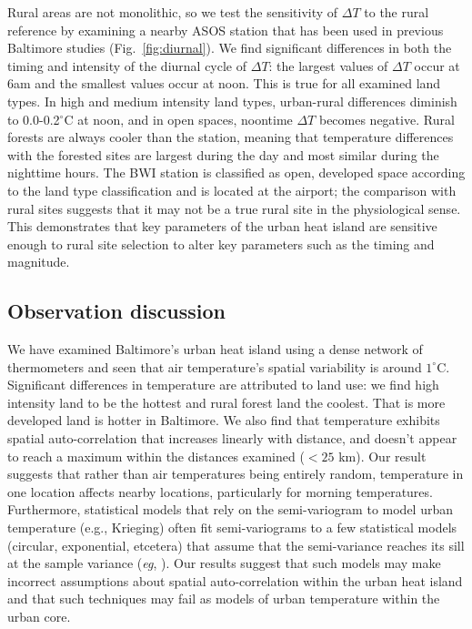 \documentclass[draft,linenumbers]{agujournal}
\begin{document}
Rural areas are not monolithic, so we test the sensitivity of $\Delta T$ to the rural reference by examining a nearby ASOS station that has been used in previous Baltimore studies \citep{li2013synergistic} (Fig.~\ref{fig:diurnal}). We find significant differences in both the timing and intensity of the diurnal cycle of $\Delta T$: the largest values of $\Delta T$ occur at 6am and the smallest values occur at noon. This is true for all examined land types. In high and medium intensity land types, urban-rural differences diminish to 0.0-0.2$^\circ$C at noon, and in open spaces, noontime $\Delta T$ becomes negative. Rural forests are always cooler than the station, meaning that temperature differences with the forested sites are largest during the day and most similar during the nighttime hours. The BWI station is classified as open, developed space according to the land type classification and is located at the airport; the comparison with rural sites suggests that it may not be a true rural site in the physiological sense. This demonstrates that key parameters of the urban heat island are sensitive enough to rural site selection to alter key parameters such as the timing and magnitude. 


\subsection{Observation discussion}
We have examined Baltimore's urban heat island using a dense network of thermometers and seen that air temperature's spatial variability is around $1^\circ$C. Significant differences in temperature are attributed to land use: we find high intensity land to be the hottest and rural forest land the coolest. That is more developed land is hotter in Baltimore. We also find that temperature exhibits spatial auto-correlation that increases linearly with distance, and doesn't appear to reach a maximum within the distances examined ($<25$ km). 
 Our result suggests that rather than air temperatures being entirely random, temperature in one location affects nearby locations, particularly for morning temperatures. Furthermore, statistical models that rely on the semi-variogram to model urban temperature (e.g., Krieging) often fit semi-variograms to a few statistical models (circular, exponential, etcetera) that assume that the semi-variance reaches its sill at the sample variance (\textit{eg}, \cite{hardin2017urban}). Our results suggest that such models may make incorrect assumptions about spatial auto-correlation within the urban heat island and that such techniques may fail as models of urban temperature within the urban core.
 
\end{document}
